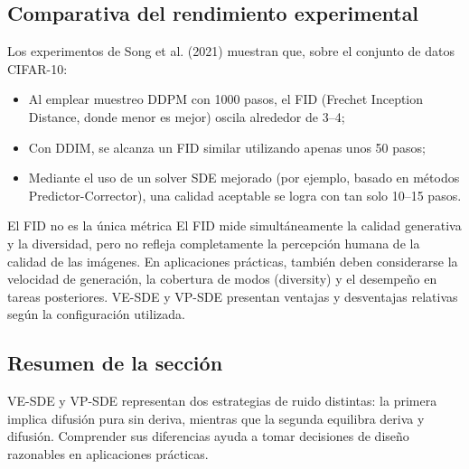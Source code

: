 \subsection{Comparativa del rendimiento experimental}

Los experimentos de Song et al. (2021) muestran que, sobre el conjunto de datos CIFAR-10:
\begin{itemize}
    \item Al emplear muestreo DDPM con 1000 pasos, el FID (Frechet Inception Distance, donde menor es mejor) oscila alrededor de 3--4;
    \item Con DDIM, se alcanza un FID similar utilizando apenas unos 50 pasos;
    \item Mediante el uso de un solver SDE mejorado (por ejemplo, basado en métodos Predictor-Corrector), una calidad aceptable se logra con tan solo 10--15 pasos.
\end{itemize}

\begin{warningbox}{El FID no es la única métrica}
El FID mide simultáneamente la calidad generativa y la diversidad, pero no refleja completamente la percepción humana de la calidad de las imágenes. En aplicaciones prácticas, también deben considerarse la velocidad de generación, la cobertura de modos (diversity) y el desempeño en tareas posteriores. VE-SDE y VP-SDE presentan ventajas y desventajas relativas según la configuración utilizada.
\end{warningbox}

\subsection{Resumen de la sección}

VE-SDE y VP-SDE representan dos estrategias de ruido distintas: la primera implica difusión pura sin deriva, mientras que la segunda equilibra deriva y difusión. Comprender sus diferencias ayuda a tomar decisiones de diseño razonables en aplicaciones prácticas.
